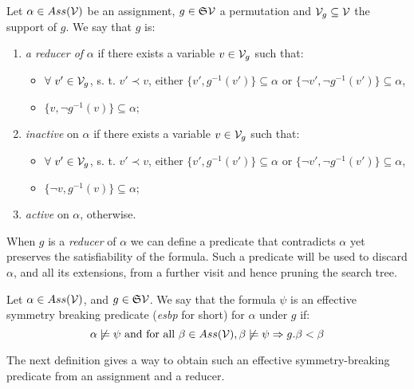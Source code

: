 \begin{proposition}
	\label{prop:status}
	Let $\alpha \in Ass(\mathcal{V})$ be an assignment, $g \in \mathfrak{S}{\mathcal{V}}$ a permutation and $ \mathcal{V}_g \subseteq  \mathcal{V}$ the support of $g$. We say that $g$ is:
	\begin{enumerate}
		\item  \emph{a reducer of} $\alpha$  if there exists a variable $v \in \mathcal{V}_g$
		such that:
		\begin{itemize}
			\item $\forall\ v' \in \mathcal{V}_g$, s. t. $v' \prec v$, either $\{v', g^{-1}(v')\}\subseteq\alpha $ or $\{\neg v', \neg g^{-1}(v')\} \subseteq \alpha $,
			\item $\{v, \neg g^{-1}(v)\} \subseteq \alpha$;
		\end{itemize}
		\item  \emph{inactive} on $\alpha$  if there exists a variable $v \in \mathcal{V}_g$
		such that:
		\begin{itemize}
			\item $\forall\ v' \in \mathcal{V}_g$, s. t. $v' \prec v$, either $\{v', g^{-1}(v')\}\subseteq\alpha $ or $\{\neg v', \neg g^{-1}(v')\} \subseteq \alpha $,
			\item $\{\neg v, g^{-1}(v)\} \subseteq \alpha$;
		\end{itemize}
		\item  \emph{active} on $\alpha$, otherwise.
	\end{enumerate}
\end{proposition}

When $g$ is a \textit{reducer} of $\alpha$ we can define a predicate that contradicts $\alpha$ yet preserves the satisfiability of the formula. Such a predicate will be used to discard $\alpha$, and all its extensions, from a further visit and hence pruning the search tree.

\begin{definition}
	\label{def:esbp}
	Let $\alpha \in Ass(\mathcal{V})$, and $g \in \mathfrak{S}{\mathcal{V}}$.
	We say that the formula $\psi$ is an effective symmetry breaking predicate (\textit{esbp} for short) for $\alpha$ under $g$ if:
	$$\alpha \not\models \psi \text{ and for all }\beta \in Ass(\mathcal{V}), \beta \not\models \psi \Rightarrow g.\beta < \beta$$
\end{definition}

The next definition gives a way to obtain such an effective symmetry-breaking predicate from an assignment and a reducer.

